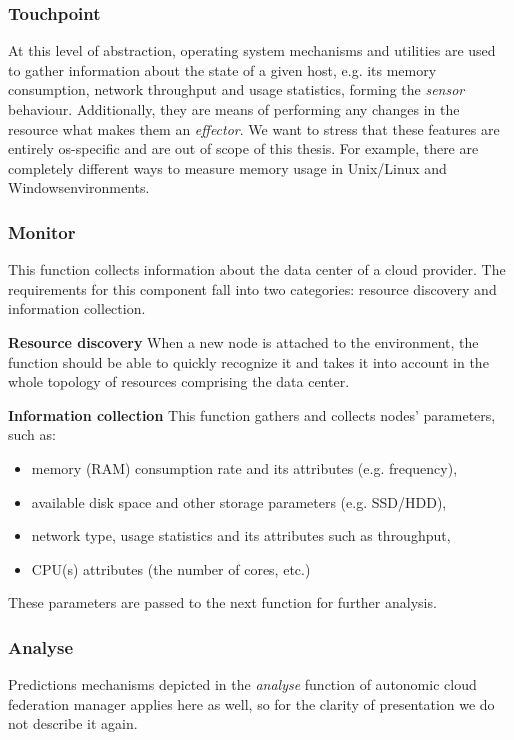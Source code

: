 \subsubsection*{Touchpoint}
At this level of abstraction, operating system mechanisms and utilities are used to gather information about the state of a given host, e.g. its memory consumption, network throughput and usage statistics, forming the \emph{sensor} behaviour.  Additionally, they are means of performing any changes in the resource what makes them an \emph{effector}.  We want to stress that these features are entirely os-specific and are out of scope of this thesis. For example, there are completely different ways to measure memory usage in Unix/Linux and Windows\texttrademark  environments.

\subsubsection{Monitor}
This function collects information about the data center of a cloud provider. The requirements for this component fall into two categories: resource discovery and information collection.

\begin{asparaenum}
\item[\textbf{Resource discovery}] When a new node is attached to the environment, the function should be able to quickly recognize it and takes it into account in the whole topology of resources comprising the data center.
\item[\textbf{Information collection}] This function gathers and collects nodes' parameters, such as:
  \begin{itemize}
    \item memory (RAM) consumption rate and its attributes (e.g. frequency),
    \item available disk space and other storage parameters (e.g. SSD/HDD),
    \item network type, usage statistics and its attributes such as throughput,
    \item CPU(s) attributes (the number of cores, etc.)
  \end{itemize}
  These parameters are passed to the next function for further analysis.
\end{asparaenum}

\subsubsection{Analyse}
Predictions mechanisms depicted in the \emph{analyse} function of autonomic cloud federation manager applies here as well, so for the clarity of presentation we do not describe it again.

